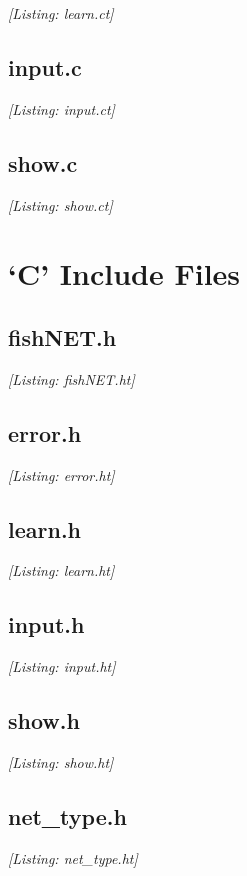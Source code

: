 \documentclass[12pt]{report}
\begin{document}
\textit{[Listing: learn.ct]}

\subsection*{input.c}

\textit{[Listing: input.ct]}

\subsection*{show.c}

\textit{[Listing: show.ct]}

\section*{`C' Include Files}

\subsection*{fishNET.h}

\textit{[Listing: fishNET.ht]}

\subsection*{error.h}

\textit{[Listing: error.ht]}

\subsection*{learn.h}

\textit{[Listing: learn.ht]}

\subsection*{input.h}

\textit{[Listing: input.ht]}

\subsection*{show.h}

\textit{[Listing: show.ht]}

\subsection*{net\_type.h}

\textit{[Listing: net_type.ht]}
\end{document}
